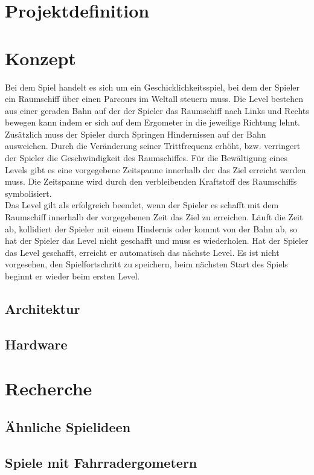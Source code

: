 

\chapter{Projektdefinition}


\chapter{Konzept}
Bei dem Spiel handelt es sich um ein Geschicklichkeitsspiel, bei dem der Spieler ein Raumschiff über einen Parcours im Weltall steuern muss. Die Level bestehen aus einer geraden Bahn auf der der Spieler das Raumschiff nach Links und Rechts bewegen kann indem er sich auf dem Ergometer in die jeweilige Richtung lehnt. Zusätzlich muss der Spieler durch Springen Hindernissen auf der Bahn ausweichen. Durch die Veränderung seiner Trittfrequenz erhöht, bzw. verringert der Spieler die Geschwindigkeit des Raumschiffes. Für die Bewältigung eines Levels gibt es eine vorgegebene Zeitspanne innerhalb der das Ziel erreicht werden muss. Die Zeitspanne wird durch den verbleibenden Kraftstoff des Raumschiffs symbolisiert.\\
Das Level gilt als erfolgreich beendet, wenn der Spieler es schafft mit dem Raumschiff innerhalb der vorgegebenen Zeit das Ziel zu erreichen. Läuft die Zeit ab, kollidiert der Spieler mit einem Hindernis oder kommt von der Bahn ab, so hat der Spieler das Level nicht geschafft und muss es wiederholen. Hat der Spieler das Level geschafft, erreicht er automatisch das nächste Level. Es ist nicht vorgesehen, den Spielfortschritt zu speichern, beim nächsten Start des Spiels beginnt er wieder beim ersten Level.
\section{Architektur}

\section{Hardware}


 
\chapter{Recherche}
\section{Ähnliche Spielideen}


\section{Spiele mit Fahrradergometern}
\label{StateOfTheArt}









